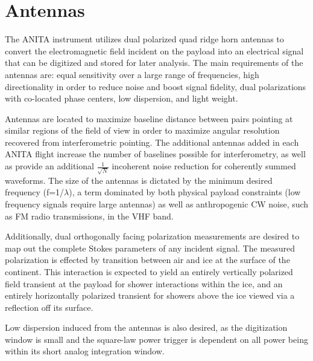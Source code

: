 	
\section{Antennas}
	The ANITA instrument utilizes dual polarized quad ridge horn antennas to convert the electromagnetic field incident on the payload into an electrical signal that can be digitized and stored for later analysis.  The main requirements of the antennas are: equal sensitivity over a large range of frequencies, high directionality in order to reduce noise and boost signal fidelity, dual polarizations with co-located phase centers, low dispersion, and light weight.
	
	Antennas are located to maximize baseline distance between pairs pointing at similar regions of the field of view in order to maximize angular resolution recovered from interferometric pointing.  The additional antennas added in each ANITA flight increase the number of baselines possible for interferometry, as well as provide an additional $\frac{1}{\sqrt{N}}$ incoherent noise reduction for coherently summed waveforms.  The size of the antennas is dictated by the minimum desired frequency (f=1/$\lambda$), a term dominated by both physical payload constraints (low frequency signals require large antennas) as well as anthropogenic CW noise, such as FM radio transmissions, in the VHF band.  
	
	Additionally, dual orthogonally facing polarization measurements are desired to map out the complete Stokes parameters of any incident signal.  The measured polarization is effected by transition between air and ice at the surface of the continent.  This interaction is expected to yield an entirely vertically polarized field transient at the payload for shower interactions within the ice, and an entirely horizontally polarized transient for showers above the ice viewed via a reflection off its surface.  
	
	Low dispersion induced from the antennas is also desired, as the digitization window is small and the square-law power trigger is dependent on all power being within its short analog integration window.
	
